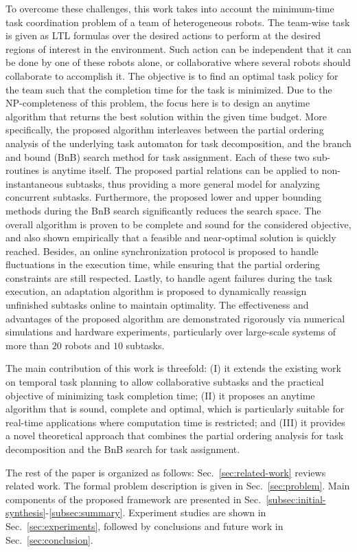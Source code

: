 To overcome these challenges,
this work takes into account the minimum-time task coordination problem of a team of heterogeneous robots.
The team-wise task is given as LTL formulas over the desired actions to perform at the
desired regions of interest in the environment.
Such action can be independent that it can be done by one of these robots alone,
or collaborative where several robots should collaborate to accomplish it.
The objective is to find an optimal task policy for the team such that the completion time for the task is minimized.
Due to the NP-completeness of this problem,
the focus here is to design an anytime algorithm that returns the best solution within the given time budget.
More specifically,
the proposed algorithm interleaves between the partial ordering analysis
of the underlying task automaton for task decomposition,
and the branch and bound (BnB) search method for task assignment.
Each of these two sub-routines is anytime itself.
The proposed partial relations can be applied to non-instantaneous subtasks,
thus providing a more general model for analyzing concurrent subtasks.
Furthermore, the proposed lower and upper bounding methods during the BnB search
significantly reduces the search space.
The overall algorithm is proven to be complete and sound for the considered objective,
and also shown empirically that a feasible and near-optimal solution is quickly reached.
Besides,
an online synchronization protocol is proposed to handle fluctuations in the execution time,
while ensuring that the partial ordering constraints are still respected.
Lastly, to handle agent failures during the task execution,
an adaptation algorithm is proposed to dynamically reassign unfinished subtasks
online to maintain optimality.
The effectiveness and advantages of the proposed algorithm
are demonstrated rigorously via numerical simulations and hardware experiments,
particularly over {large-scale} systems of more than $20$ robots and $10$ subtasks.


The main contribution of this work is threefold:
(I) it extends the existing work on temporal task planning to allow collaborative subtasks
and the practical objective of minimizing task completion time;
(II) it proposes an anytime algorithm that is sound, complete and optimal,
which is particularly suitable for real-time applications where computation time is restricted;
and (III) it provides a novel theoretical approach that combines the partial ordering
analysis for task decomposition and the BnB search for task assignment.

The rest of the paper is organized as follows:
Sec.~\ref{sec:related-work} reviews related work.
The formal problem description is given in Sec.~\ref{sec:problem}.
Main components of the proposed framework are presented in
Sec.~\ref{subsec:initial-synthesis}-\ref{subsec:summary}.
Experiment studies are shown in Sec.~\ref{sec:experiments},
followed by conclusions and future work in Sec.~\ref{sec:conclusion}.
